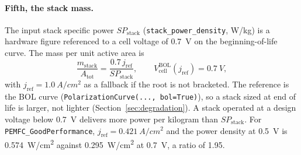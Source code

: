\documentclass[a4paper,11pt]{article}
\newcommand{\code}[1]{\nolinkurl{#1}}
\begin{document}
\paragraph{Fifth, the stack mass.} The input stack specific power $SP_\mathrm{stack}$
(\code{stack_power_density}, W/kg) is a hardware figure referenced to a cell voltage of
\SI{0.7}{V} on the beginning-of-life curve. The mass per unit active area is
\begin{equation}
  \frac{m_\mathrm{stack}}{A_\mathrm{tot}} = \frac{0.7\,j_\mathrm{ref}}{SP_\mathrm{stack}},
  \qquad V^\mathrm{BOL}_\mathrm{cell}(j_\mathrm{ref}) = \SI{0.7}{V},
  \label{eq:mstack}
\end{equation}
with $j_\mathrm{ref}=\SI{1.0}{A/cm^2}$ as a fallback if the root is not bracketed. The
reference is the BOL curve (\code{PolarizationCurve(..., bol=True)}), so a stack sized at end
of life is larger, not lighter (Section~\ref{sec:degradation}). A stack operated at a design
voltage below \SI{0.7}{V} delivers more power per kilogram than $SP_\mathrm{stack}$. For
\code{PEMFC_GoodPerformance}, $j_\mathrm{ref}=\SI{0.421}{A/cm^2}$ and the power density at
\SI{0.5}{V} is \SI{0.574}{W/cm^2} against \SI{0.295}{W/cm^2} at \SI{0.7}{V}, a ratio of 1.95.
\end{document}
